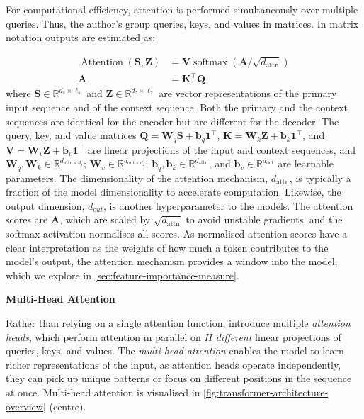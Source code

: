 For computational efficiency, attention is performed simultaneously over multiple queries. Thus, the author's group queries, keys, and values in matrices. In matrix notation outputs are estimated as:

\begin{equation}
    \begin{aligned}
        \operatorname{Attention}(\mathbf{S},\mathbf{Z}) & = \mathbf{V} \operatorname{softmax}\left(\mathbf{A} / \sqrt{d_{\mathrm{attn}}}\right) \\
        \mathbf{A}                                      & = \mathbf{K}^{\top} \mathbf{Q}
    \end{aligned}
    \label{eq:attention}
\end{equation}
where $\mathbf{S} \in \mathbb{R}^{d_s \times \ell_s}$ and $\mathbf{Z} \in \mathbb{R}^{d_z \times \ell_z}$ are vector representations of the primary input sequence and of the context sequence. Both the primary and the context sequences are identical for the encoder but are different for the decoder. The query, key, and value matrices $\mathbf{Q}=\mathbf{W}_q \mathbf{S} + \mathbf{b}_q\mathbf{1}^{\top}$, $\mathbf{K}=\mathbf{W}_k \mathbf{Z} + \mathbf{b}_k\mathbf{1}^{\top}$, and $\mathbf{V}=\mathbf{W}_v \mathbf{Z} + \mathbf{b}_v\mathbf{1}^{\top}$ are linear projections of the input and context sequences, and $\mathbf{W}_q, \mathbf{W}_k \in \mathbb{R}^{d_{\mathrm{attn}\times d_{s}}}$; $\mathbf{W}_v \in \mathbb{R}^{d_{\mathrm{out}\times d_{z}}}$; $\mathbf{b}_q, \mathbf{b}_k \in \mathbb{R}^{d_{\mathrm{attn}}}$, and $\mathbf{b}_v \in \mathbb{R}^{d_{\mathrm{out}}}$ are learnable parameters. The dimensionality of the attention mechanism, $d_{\mathrm{attn}}$, is typically a fraction of the model dimensionality to accelerate computation. Likewise, the output dimension, $d_{out}$, is another hyperparameter to the models. The attention scores are $\mathbf{A}$, which are scaled by $\sqrt{d_{\mathrm{attn}}}$ to avoid unstable gradients, and the softmax activation normalises all scores. As normalised attention scores have a clear interpretation as the weights of how much a token contributes to the model's output, the attention mechanism provides a window into the model, which we explore in \cref{sec:feature-importance-measure}.

\textbf{Multi-Head Attention}

Rather than relying on a single attention function, \textcite[][4--5]{vaswaniAttentionAllYou2017} introduce multiple \emph{attention heads}, which perform attention in parallel on $H$ \emph{different} linear projections of queries, keys, and values. The \emph{multi-head attention} enables the model to learn richer representations of the input, as attention heads operate independently, they can pick up unique patterns or focus on different positions in the sequence at once. Multi-head attention is visualised in \cref{fig:transformer-architecture-overview} (centre).

